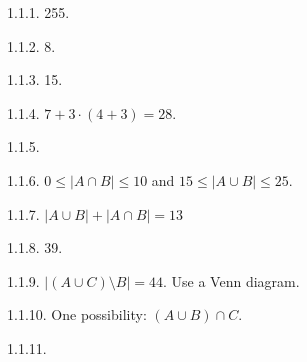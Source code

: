  \protect {} \protect \begin {itemize} 
\begin{ans}{1.1.1.}
    255.
  
\end{ans}
\begin{ans}{1.1.2.}
    8.
  
\end{ans}
\begin{ans}{1.1.3.}
    15.
  
\end{ans}
\begin{ans}{1.1.4.}
		$7 + 3\cdot (4+3) = 28$.
	
\end{ans}
\begin{ans}{1.1.5.}
  
\end{ans}
\begin{ans}{1.1.6.}
    $0 \le |A \cap B| \le 10$ and $15 \le |A \cup B| \le 25$.
  
\end{ans}
\begin{ans}{1.1.7.}
      $|A \cup B| + |A \cap B| = 13$
  
\end{ans}
\begin{ans}{1.1.8.}
    39.
  
\end{ans}
\begin{ans}{1.1.9.}
      $|(A \cup C)\setminus B| = 44$.  Use a Venn diagram.
    
\end{ans}
\begin{ans}{1.1.10.}
	One possibility: $(A \cup B) \cap C$.
    
\end{ans}
\begin{ans}{1.1.11.}
    \begin{parts}

\end{parts}
\end{ans}
\end{itemize}
